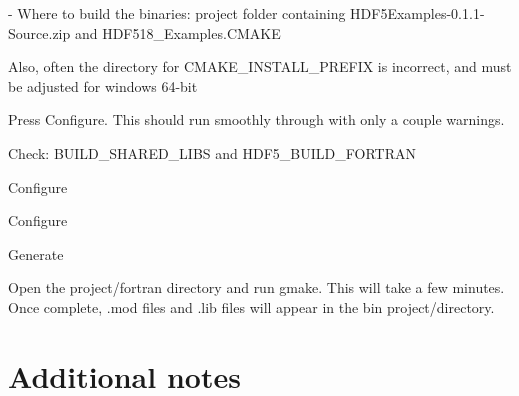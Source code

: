 \documentclass[11pt]{article}
\begin{document}
- Where to build the binaries: project folder containing HDF5Examples-0.1.1-Source.zip and HDF518\_Examples.CMAKE

Also, often the directory for CMAKE\_INSTALL\_PREFIX is incorrect, and must be adjusted for windows 64-bit

Press Configure. This should run smoothly through with only a couple warnings.

Check: BUILD\_SHARED\_LIBS and HDF5\_BUILD\_FORTRAN

Configure

Configure

Generate

Open the project/fortran directory and run gmake. This will take a few minutes. Once complete, .mod files and .lib files will appear in the bin project/directory.


\section{Additional notes}
\end{document}
